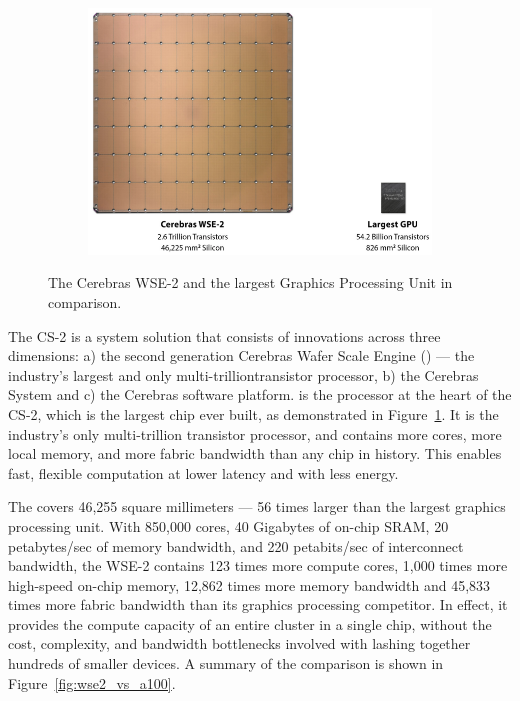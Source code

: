 

\begin{figure}[b!]
  \centering
  \begin{subfigure}{0.70\columnwidth}
    \includegraphics[width=\linewidth]{figures/wse2_vs_gpu.png}
  \end{subfigure}
  \caption{The Cerebras WSE-2 and the largest Graphics Processing Unit in comparison.}
  \label{fig:wse2_vs_gpu}
\end{figure}

The CS-2 is a system solution that consists of innovations across three dimensions: a) the second generation Cerebras Wafer Scale Engine (\wse) — the industry’s largest and only multi-trilliontransistor processor, b) the Cerebras System and c) the Cerebras software platform.
%
\wse is the processor at the heart of the CS-2, which is the largest chip ever built, as demonstrated in Figure~\ref{fig:wse2_vs_gpu}.
%
It is the industry’s only multi-trillion transistor processor, and contains more cores, more local memory, and more fabric bandwidth than any chip in history.
%
This enables fast, flexible computation at lower latency and with less energy.

The \wse covers 46,255 square millimeters — 56 times larger than the largest graphics processing unit.
With 850,000 cores, 40 Gigabytes of on-chip SRAM, 20 petabytes/sec of memory bandwidth, and 220
petabits/sec of interconnect bandwidth, the WSE-2 contains 123 times more compute cores, 1,000 times
more high-speed on-chip memory, 12,862 times more memory bandwidth and 45,833 times more fabric
bandwidth than its graphics processing competitor. In effect, it provides the compute capacity of an entire
cluster in a single chip, without the cost, complexity, and bandwidth bottlenecks involved with lashing
together hundreds of smaller devices. A summary of the comparison is shown in Figure~\ref{fig:wse2_vs_a100}.

